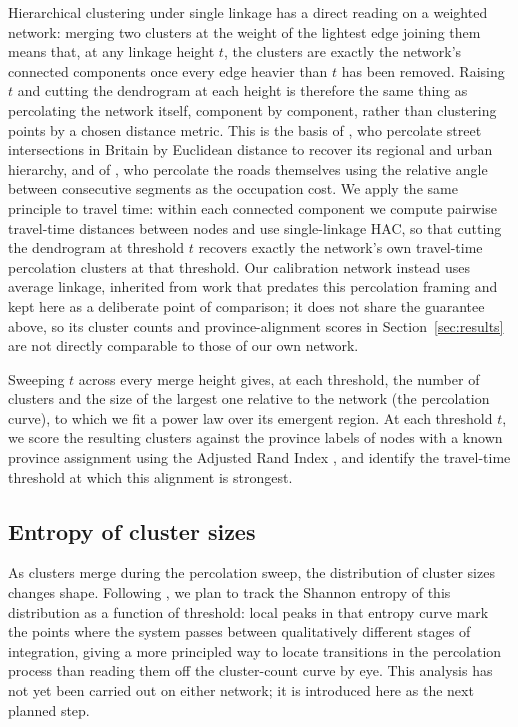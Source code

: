 \documentclass[11pt,a4paper]{article}
\begin{document}
Hierarchical clustering under single linkage has a direct reading on a
weighted network: merging two clusters at the weight of the lightest
edge joining them means that, at any linkage height $t$, the clusters
are exactly the network's connected components once every edge heavier
than $t$ has been removed. Raising $t$ and cutting the dendrogram at
each height is therefore the same thing as percolating the network
itself, component by component, rather than clustering points by a
chosen distance metric. This is the basis of \citet{arcaute2016cities},
who percolate street intersections in Britain by Euclidean distance to
recover its regional and urban hierarchy, and of
\citet{molinero2017angular}, who percolate the roads themselves using
the relative angle between consecutive segments as the occupation cost.
We apply the same principle to travel time: within each connected
component we compute pairwise travel-time distances between nodes and
use single-linkage HAC, so that cutting the dendrogram at threshold $t$
recovers exactly the network's own travel-time percolation clusters at
that threshold. Our calibration network instead uses average linkage,
inherited from work that predates this percolation framing and kept
here as a deliberate point of comparison; it does not share the
guarantee above, so its cluster counts and province-alignment scores in
Section~\ref{sec:results} are not directly comparable to those of our
own network.

Sweeping $t$ across every merge height gives, at each threshold, the
number of clusters and the size of the largest one relative to the
network (the percolation curve), to which we fit a power law over its
emergent region. At each threshold $t$, we score the resulting clusters against the
province labels of nodes with a known province assignment using the
Adjusted Rand Index \citep[ARI;][]{hubert1985comparing}, and identify
the travel-time threshold at which this alignment is strongest.

\subsection{Entropy of cluster sizes}
\label{sec:entropy}

As clusters merge during the percolation sweep, the distribution of
cluster sizes changes shape. Following \citet{molinero2017angular}, we
plan to track the Shannon entropy of this distribution as a function of
threshold: local peaks in that entropy curve mark the points where the
system passes between qualitatively different stages of integration,
giving a more principled way to locate transitions in the percolation
process than reading them off the cluster-count curve by eye. This
analysis has not yet been carried out on either network; it is
introduced here as the next planned step.
\end{document}
